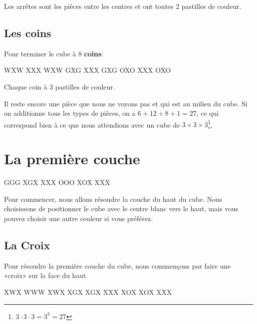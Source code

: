 \documentclass[10pt,paper=a5,pagesize]{scrbook}
\begin{document}
Les arrêtes sont les pièces entre les centres et ont toutes 2 pastilles de couleur.

\section{Les coins}

Pour terminer le cube à 8 \textbf{coins}:

\begin{center}
	\RubikFaceUp%
	{W}{X}{W}%
	{X}{X}{X}%
	{W}{X}{W}
	\RubikFaceRight%
	{G}{X}{G}%
	{X}{X}{X}%
	{G}{X}{G}
	\RubikFaceFront%
	{O}{X}{O}%
	{X}{X}{X}%
	{O}{X}{O}
\end{center}

Chaque coin à 3 pastilles de couleur.

Il reste encore une pièce que nous ne voyons pas et qui est au milieu du cube. Si on additionne tous les types de pièces, on a $6 + 12 + 8 + 1 = 27$, ce qui correspond bien à ce que nous attendions avec un cube de $3 \times 3 \times 3$\footnote{$3 \cdot 3 \cdot 3 = 3^3 = 27$}.


\chapter{La première couche}

{
\centering
{}
\RubikFaceRight%
{G}{G}{G}%
{X}{G}{X}%
{X}{X}{X}
\RubikFaceFront%
{O}{O}{O}%
{X}{O}{X}%
{X}{X}{X}
\par
}
\medskip

Pour commencer, nous allons résoudre la couche du haut du cube. Nous choisissons de positionner
le cube avec le centre blanc vers le haut, mais vous pouvez choisir une autre couleur si vous préférez.


\section{La Croix}

Pour résoudre la première couche du cube, nous commençons
par faire une «croix» sur la face du haut.

\begin{center}
\RubikFaceUp%
{X}{W}{X}%
{W}{W}{W}%
{X}{W}{X}
\RubikFaceRight%
{X}{G}{X}%
{X}{G}{X}%
{X}{X}{X}
\RubikFaceFront%
{X}{O}{X}%
{X}{O}{X}%
{X}{X}{X}
\end{center}
\end{document}
